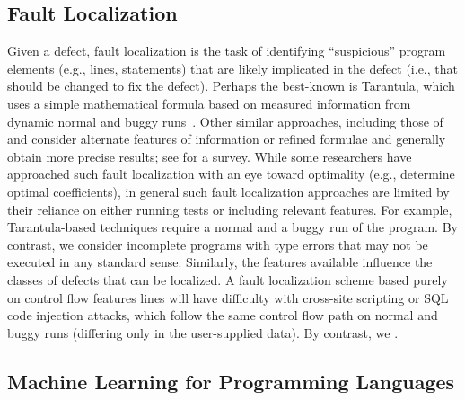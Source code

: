 \subsection{Fault Localization}
Given a defect, fault localization is the task of identifying
``suspicious'' program elements (e.g., lines, statements) that are likely
implicated in the defect (i.e., that should be changed to fix the defect).
Perhaps the best-known is Tarantula, which uses a simple mathematical
formula based on measured information from dynamic normal and buggy
runs~\citep{Jones2002-us}. Other similar approaches, including those of
\citet{Chen2002-qz} and \citet{Abreu2006-fn,Abreu2007-mu} consider alternate features
of information or refined formulae and generally obtain more precise
results; see \citet{Wong2009-pd} for a survey. While some researchers have
approached such fault localization with an eye toward optimality (e.g.,
\citet{Yoo2013-rw} determine optimal coefficients), in general
such fault localization approaches are limited by their reliance on either
running tests or including relevant features. For example, Tarantula-based
techniques require a normal and a buggy run of the program. By contrast,
we consider incomplete programs with type errors that may not be executed
in any standard sense. Similarly, the features available influence the
classes of defects that can be localized. A fault localization scheme based
purely on control flow features lines will have difficulty with cross-site
scripting or SQL code injection attacks, which follow the same control flow
path on normal and buggy runs (differing only in the user-supplied data).
By contrast, we .


\subsection{Machine Learning for Programming Languages}
\label{sec:ml-pl}



